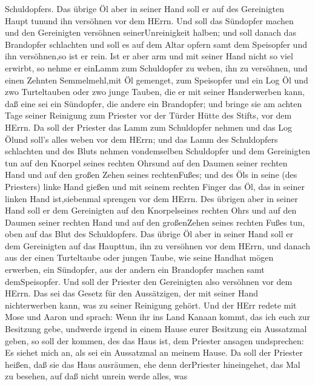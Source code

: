 Schuldopfers.  Das übrige Öl aber in seiner Hand soll er
auf des Gereinigten Haupt tunund ihn versöhnen vor dem HErrn.
 Und soll das Sündopfer machen und den Gereinigten
versöhnen seinerUnreinigkeit halben; und soll danach das Brandopfer
schlachten  und soll es auf dem Altar opfern samt dem
Speisopfer und ihn versöhnen,so ist er rein.  Ist er aber
arm und mit seiner Hand nicht so viel erwirbt, so nehme er einLamm zum
Schuldopfer zu weben, ihn zu versöhnen, und einen Zehnten Semmelmehl,mit
Öl gemenget, zum Speisopfer und ein Log Öl  und zwo
Turteltauben oder zwo junge Tauben, die er mit seiner Handerwerben kann,
daß eine sei ein Sündopfer, die andere ein Brandopfer;  und
bringe sie am achten Tage seiner Reinigung zum Priester vor der Türder
Hütte des Stifts, vor dem HErrn.  Da soll der Priester das
Lamm zum Schuldopfer nehmen und das Log Ölund soll's alles weben vor dem
HErrn;  und das Lamm des Schuldopfers schlachten und des
Bluts nehmen vondemselben Schuldopfer und dem Gereinigten tun auf den
Knorpel seines rechten Ohrsund auf den Daumen seiner rechten Hand und
auf den großen Zehen seines rechtenFußes;  und des Öls in
seine (des Priesters) linke Hand gießen  und mit seinem
rechten Finger das Öl, das in seiner linken Hand ist,siebenmal sprengen
vor dem HErrn.  Des übrigen aber in seiner Hand soll er dem
Gereinigten auf den Knorpelseines rechten Ohrs und auf den Daumen seiner
rechten Hand und auf den großenZehen seines rechten Fußes tun, oben auf
das Blut des Schuldopfers.  Das übrige Öl aber in seiner
Hand soll er dem Gereinigten auf das Haupttun, ihn zu versöhnen vor dem
HErrn,  und danach aus der einen Turteltaube oder jungen
Taube, wie seine Handhat mögen erwerben,  ein Sündopfer,
aus der andern ein Brandopfer machen samt demSpeisopfer. Und soll der
Priester den Gereinigten also versöhnen vor dem HErrn.  Das
sei das Gesetz für den Aussätzigen, der mit seiner Hand nichterwerben
kann, was zu seiner Reinigung gehört.  Und der HErr redete
mit Mose und Aaron und sprach:  Wenn ihr ins Land Kanaan
kommt, das ich euch zur Besitzung gebe, undwerde irgend in einem Hause
eurer Besitzung ein Aussatzmal geben,  so soll der kommen,
des das Haus ist, dem Priester ansagen undsprechen: Es siehet mich an,
als sei ein Aussatzmal an meinem Hause.  Da soll der
Priester heißen, daß sie das Haus ausräumen, ehe denn derPriester
hineingehet, das Mal zu besehen, auf daß nicht unrein werde alles, was
